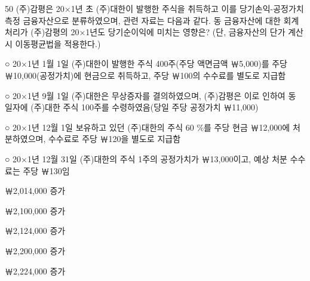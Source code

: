 \begin{question}{50}
(주)감평은 20×1년 초 (주)대한이 발행한 주식을 취득하고 이를 당기손익-공정가치 측정 금융자산으로 분류하였으며, 관련 자료는 다음과 같다. 동 금융자산에 대한 회계처리가 (주)감평의 20×1년도 당기순이익에 미치는 영향은? (단, 금융자산의 단가 계산 시 이동평균법을 적용한다.)
\begin{framedtext}
○ 20×1년 1월 1일 (주)대한이 발행한 주식 400주(주당 액면금액 ￦5,000)를 주당 ￦10,000(공정가치)에 현금으로 취득하고, 주당 ￦100의 수수료를 별도로 지급함 \par
○ 20×1년 9월 1일 (주)대한은 무상증자를 결의하였으며, (주)감평은 이로 인하여 동 일자에 (주)대한 주식 100주를 수령하였음(당일 주당 공정가치 ￦11,000) \par
○ 20×1년 12월 1일 보유하고 있던 (주)대한의 주식 60 \%를 주당 현금 ￦12,000에 처분하였으며, 수수료로 주당 ￦120을 별도로 지급함 \par
○ 20×1년 12월 31일 (주)대한의 주식 1주의 공정가치가 ￦13,000이고, 예상 처분 수수료는 주당 ￦130임 \par
\end{framedtext}
\begin{choices}
  \item ￦2,014,000 증가
  \item ￦2,100,000 증가
  \item ￦2,124,000 증가
  \item ￦2,200,000 증가
  \item ￦2,224,000 증가
\end{choices}
\end{question}

